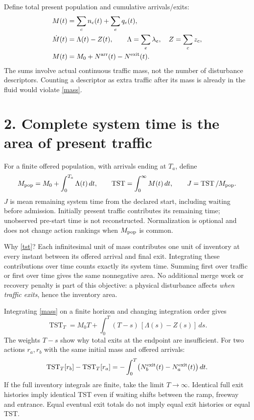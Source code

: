 \documentclass[11pt,a4paper]{article}
\newcommand{\TST}{\operatorname{TST}}
\begin{document}
Define total present population and cumulative arrivals/exits:
\begin{align}
M(t)&=\sum_c n_c(t)+\sum_e q_e(t),\\
\dot M(t)&=\Lambda(t)-Z(t),\qquad
\Lambda=\sum_e\lambda_e,\quad Z=\sum_c z_c,\\
M(t)&=M_0+N^{\rm arr}(t)-N^{\rm exit}(t). \label{mass}
\end{align}
The sums involve actual continuous traffic mass, not the number of disturbance
descriptors. Counting a descriptor as extra traffic after its mass is already
in the fluid would violate \eqref{mass}.

\newpage
\section*{2. Complete system time is the area of present traffic}
For a finite offered population, with arrivals ending at $T_a$, define
\begin{equation}
M_{\rm pop}=M_0+\int_0^{T_a}\Lambda(t)\,dt,\qquad
\TST=\int_0^{\infty} M(t)\,dt,\qquad
J=\TST/M_{\rm pop}. \label{tst}
\end{equation}
$J$ is mean remaining system time from the declared start, including waiting
before admission. Initially present traffic contributes its remaining time;
unobserved pre-start time is not reconstructed. Normalization is optional and
does not change action rankings when $M_{\rm pop}$ is common.

Why \eqref{tst}? Each infinitesimal unit of mass contributes one unit of inventory
at every instant between its offered arrival and final exit. Integrating these
contributions over time counts exactly its system time. Summing first over
traffic or first over time gives the same nonnegative area. No additional merge
work or recovery penalty is part of this objective: a physical disturbance
affects \emph{when traffic exits}, hence the inventory area.

Integrating \eqref{mass} on a finite horizon and changing integration order gives
\begin{equation}
\TST_T=M_0T+\int_0^T(T-s)\,[\Lambda(s)-Z(s)]\,ds. \label{weighted}
\end{equation}
The weights $T-s$ show why total exits at the endpoint are insufficient. For two
actions $r_a,r_b$ with the same initial mass and offered arrivals:
\begin{equation}
\TST_T[r_b]-\TST_T[r_a]
=-\int_0^T\bigl(N^{\rm exit}_{b}(t)-N^{\rm exit}_{a}(t)\bigr)\,dt. \label{delta}
\end{equation}
If the full inventory integrals are finite, take the limit $T\to\infty$.
Identical full exit histories imply identical TST even if waiting shifts between
the ramp, freeway and entrance. Equal eventual exit totals do not imply equal
exit histories or equal TST.
\end{document}
